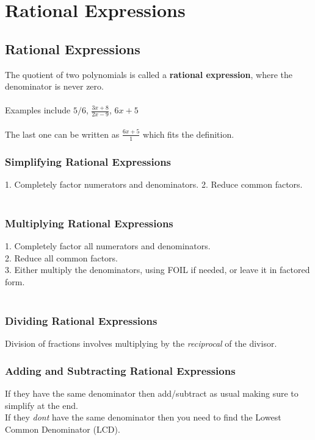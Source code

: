 \chapter{Rational Expressions}

\section{Rational Expressions}
The quotient of two polynomials is called a \textbf{rational expression}, where the denominator is never zero.\\
\\
Examples include $5/6$, $\frac{3x + 8}{2x - 9}$, $6x + 5$\\
\\
The last one can be written as $\frac{6x + 5}{1}$ which fits the definition.

\subsection{Simplifying Rational Expressions}
1. Completely factor numerators and denominators.
2. Reduce common factors.\\
\\
\subsection{Multiplying Rational Expressions}
1. Completely factor all numerators and denominators.\\
2. Reduce all common factors.\\
3. Either multiply the denominators, using FOIL if needed, or leave it in factored form.\\
\\
\subsection{Dividing Rational Expressions}
Division of fractions involves multiplying by the \textit{reciprocal} of the divisor.

\subsection{Adding and Subtracting Rational Expressions}
If they have the same denominator then add/subtract as usual making sure to simplify at the end.\\
If they \textit{dont} have the same denominator then you need to find the Lowest Common Denominator (LCD).\\

